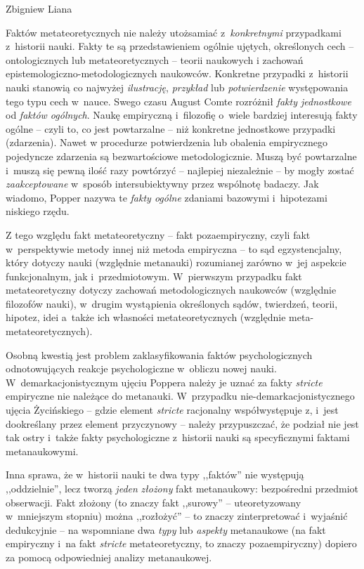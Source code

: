 \begin{artplenv}{Zbigniew Liana}
\begin{uwaga}
Faktów metateoretycznych nie należy utożsamiać z~\textit{konkretnymi} przypadkami z~historii nauki.
Fakty te są przedstawieniem ogólnie ujętych, określonych cech -- ontologicznych lub metateoretycznych -- teorii naukowych
i zachowań epistemologiczno-metodologicznych naukowców. Konkretne przypadki z~historii nauki stanowią co najwyżej
\textit{ilustrację}, \textit{przykład} lub \textit{potwierdzenie} występowania tego typu cech w~nauce. Swego czasu August
Comte rozróżnił \textit{fakty jednostkowe} od \textit{faktów ogólnych}. Naukę empiryczną i~filozofię o~wiele bardziej
interesują fakty ogólne -- czyli to, co jest powtarzalne -- niż konkretne jednostkowe przypadki (zdarzenia). Nawet w
procedurze potwierdzenia lub obalenia empirycznego pojedyncze zdarzenia są bezwartościowe metodologicznie. Muszą być
powtarzalne i~muszą się pewną ilość razy powtórzyć -- najlepiej niezależnie -- by mogły zostać \textit{zaakceptowane} w~sposób
intersubiektywny przez wspólnotę badaczy. Jak wiadomo, Popper nazywa te \textit{fakty ogólne} zdaniami bazowymi i~hipotezami
niskiego rzędu.

Z tego względu fakt metateoretyczny -- fakt pozaempiryczny, czyli fakt w~perspektywie metody innej niż metoda empiryczna
-- to sąd egzystencjalny, który dotyczy nauki (względnie metanauki) rozumianej zarówno w~jej aspekcie funkcjonalnym,
jak i~przedmiotowym. W~pierwszym przypadku fakt metateoretyczny dotyczy zachowań metodologicznych naukowców (względnie
filozofów nauki), w~drugim wystąpienia określonych sądów, twierdzeń, teorii, hipotez, idei a~także ich własności
metateoretycznych (względnie meta-metateoretycznych).
\end{uwaga}

\begin{uwaga}
Osobną kwestią jest problem zaklasyfikowania faktów psychologicznych odnotowujących reakcje
psychologiczne w~obliczu nowej nauki. W~demarkacjonistycznym ujęciu Poppera należy je uznać za fakty \textit{stricte}
empiryczne nie należące do metanauki. W~przypadku nie-demarkacjonistycznego ujęcia Życińskiego -- gdzie element
\textit{stricte} racjonalny współwystępuje z, i~jest dookreślany przez element przyczynowy -- należy przypuszczać, że
podział nie jest tak ostry i~także fakty psychologiczne z~historii nauki są specyficznymi faktami metanaukowymi.

Inna sprawa, że w~historii nauki te dwa typy ,,faktów'' nie występują ,,oddzielnie'', lecz tworzą \textit{jeden}
\textit{złożony} fakt metanaukowy: bezpośredni przedmiot obserwacji. Fakt złożony (to znaczy fakt ,,surowy'' --
uteoretyzowany w~mniejszym stopniu) można ,,rozłożyć'' -- to znaczy zinterpretować i~wyjaśnić dedukcyjnie -- na wspomniane
dwa \textit{typy} lub\textit{ aspekty} metanaukowe (na fakt empiryczny i~na fakt \textit{stricte} metateoretyczny, to znaczy
pozaempiryczny) dopiero za pomocą odpowiedniej analizy metanaukowej.


\end{uwaga}
\end{artplenv}
